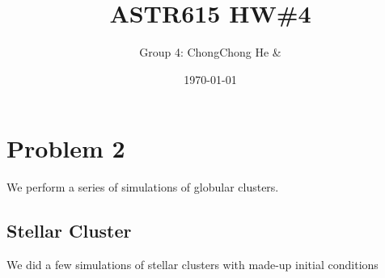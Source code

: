 
\usepackage{graphicx}
\usepackage{subcaption}



\title{ASTR615 HW\#4}
\author{Group 4: ChongChong He \& }
\date{\today}
\maketitle

\section*{Problem 2}
We perform a series of simulations of globular clusters.

\subsection*{Stellar Cluster}
We did a few simulations of stellar clusters with made-up initial conditions 

